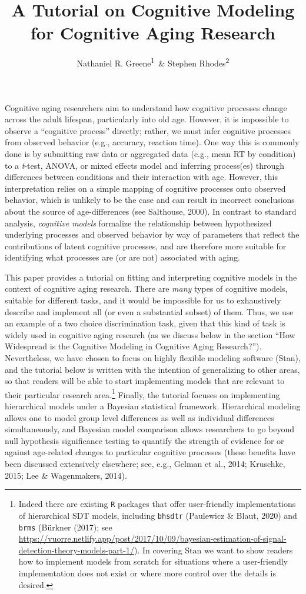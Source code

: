 \documentclass[
  english,
  ,man,floatsintext]{apa6}
\author{Nathaniel R. Greene\textsuperscript{1}\ \& Stephen Rhodes\textsuperscript{2}}
\affiliation{
\vspace{0.5cm}
\textsuperscript{1} University of Missouri\\\textsuperscript{2} Rotman Research Institute}
\title{A Tutorial on Cognitive Modeling for Cognitive Aging Research}
\date{}
\begin{document}
\maketitle

Cognitive aging researchers aim to understand how cognitive processes change across the adult lifespan, particularly into old age. However, it is impossible to observe a \enquote{cognitive process} directly; rather, we must infer cognitive processes from observed behavior (e.g., accuracy, reaction time). One way this is commonly done is by submitting raw data or aggregated data (e.g., mean RT by condition) to a \emph{t}-test, ANOVA, or mixed effects model and inferring process(es) through differences between conditions and their interaction with age. However, this interpretation relies on a simple mapping of cognitive processes onto observed behavior, which is unlikely to be the case and can result in incorrect conclusions about the source of age-differences (see Salthouse, 2000). In contrast to standard analysis, \emph{cognitive models} formalize the relationship between hypothesized underlying processes and observed behavior by way of parameters that reflect the contributions of latent cognitive processes, and are therefore more suitable for identifying what processes are (or are not) associated with aging.

This paper provides a tutorial on fitting and interpreting cognitive models in the context of cognitive aging research. There are \emph{many} types of cognitive models, suitable for different tasks, and it would be impossible for us to exhaustively describe and implement all (or even a substantial subset) of them. Thus, we use an example of a two choice discrimination task, given that this kind of task is widely used in cognitive aging research (as we discuss below in the section \enquote{How Widespread is the Cognitive Modeling in Cognitive Aging Research?}). Nevertheless, we have chosen to focus on highly flexible modeling software (Stan), and the tutorial below is written with the intention of generalizing to other areas, so that readers will be able to start implementing models that are relevant to their particular research area.\footnote{Indeed there are existing \texttt{R} packages that offer user-friendly implementations of hierarchical SDT models, including \texttt{bhsdtr} (Paulewicz \& Blaut, 2020) and \texttt{brms} (Bürkner (2017); see \url{https://vuorre.netlify.app/post/2017/10/09/bayesian-estimation-of-signal-detection-theory-models-part-1/}). In covering Stan we want to show readers how to implement models from scratch for situations where a user-friendly implementation does not exist or where more control over the details is desired.} Finally, the tutorial focuses on implementing hierarchical models under a Bayesian statistical framework. Hierarchical modeling allows one to model group level differences as well as individual differences simultaneously, and Bayesian model comparison allows researchers to go beyond null hypothesis significance testing to quantify the strength of evidence for or against age-related changes to particular cognitive processes (these benefits have been discussed extensively elsewhere; see, e.g., Gelman et al., 2014; Kruschke, 2015; Lee \& Wagenmakers, 2014).
\end{document}
